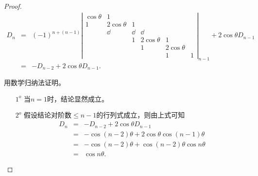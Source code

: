 \begin{frame}
\begin{proof}
$$
\begin{array}{rcl}
  D_n &=& (-1)^{n+(n-1)} \left|
          \begin{array}{cccccc}
            \cos\theta&1&&&&\\
            1&2\cos\theta&1&&&\\
                      &\dd&\dd&\dd&&\\
                      &&1&2\cos\theta&1&\\
                      &&&1&2\cos\theta&\\
                      &&&&1&1
          \end{array}
                             \right|_{n-1} + 2\cos\theta D_{n-1}\\[0.4in]    
      &=& -  D_{n-2} + 2\cos\theta D_{n-1}.    
\end{array}
$$





用数学归纳法证明。
\begin{itemize}
\item[$1^o$] 当$n=1$时，结论显然成立。
\item[$2^o$] 假设结论对阶数$\le n-1$的行列式成立，则由上式可知
  $$
  \begin{array}{rcl}
    D_n &=& -D_{n-2} + 2\cos\theta D_{n-1} \\[0.2cm]
        &=& -\cos (n-2)\theta + 2\cos\theta\cos(n-1)\theta\\[0.2cm]
        &=& -\cos (n-2)\theta + \cos (n-2)\theta \cos n \theta\\[0.2cm]
        &=& \cos n\theta.
  \end{array}      
  $$
\end{itemize}

\end{proof}

\end{frame}

